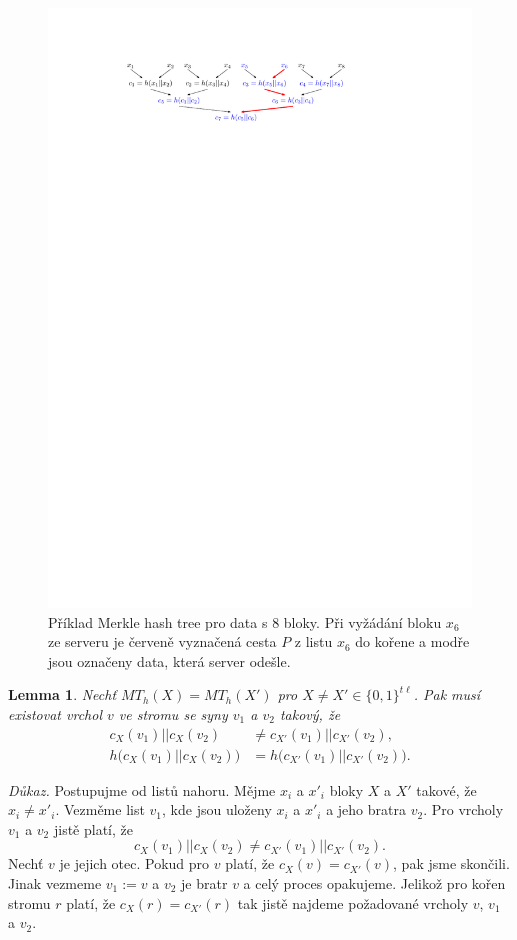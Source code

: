 \documentclass{article}
\newtheorem{lemma}{Lemma}
\begin{document}
\begin{figure}
\centering
\includegraphics{hash_tree.pdf}
\caption{Příklad Merkle hash tree pro data s 8 bloky. Při vyžádání bloku $x_6$ ze serveru je červeně vyznačená cesta $P$ z listu $x_6$ do kořene a modře jsou označeny data, která server odešle.}
\end{figure}
\begin{lemma}
Nechť $MT_h(X) = MT_h(X')$ pro $X \neq X' \in \{0,1\}^{t\ell}$. 
Pak musí existovat vrchol $v$ ve stromu se syny $v_1$ a $v_2$ takový, že 
\begin{align*}
c_X(v_1) || c_X(v_2) &\neq c_{X'}(v_1) || c_{X'}(v_2), \\
h\bigl(c_X(v_1) || c_X(v_2)\bigr) &= h\bigl(c_{X'}(v_1) || c_{X'}(v_2)\bigr).
\end{align*}
\end{lemma}
\noindent\textit{Důkaz.}
Postupujme od listů nahoru.
Mějme $x_i$ a $x'_i$ bloky $X$ a $X'$ takové, že $x_i \neq x'_i$.
Vezměme list $v_1$, kde jsou uloženy $x_i$ a $x'_i$ a jeho bratra $v_2$.
Pro vrcholy $v_1$ a $v_2$ jistě platí, že
\[
c_X(v_1) || c_X(v_2) \neq c_{X'}(v_1) || c_{X'}(v_2).
\]
Nechť $v$ je jejich otec.
Pokud pro $v$ platí, že $c_X(v) = c_{X'}(v)$, pak jsme skončili.
Jinak vezmeme $v_1 := v$ a $v_2$ je bratr $v$ a celý proces opakujeme.
Jelikož pro kořen stromu $r$ platí, že $c_X(r) = c_{X'}(r)$ tak jistě najdeme požadované vrcholy $v$, $v_1$ a $v_2$.
\end{document}
